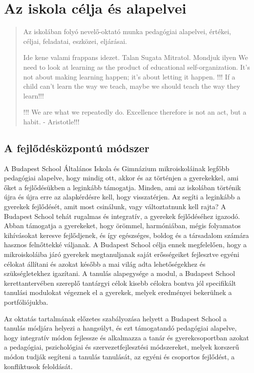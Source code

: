\chapter{Az iskola célja és alapelvei}
\label{sec:alapelvek}

\begin{quote}
  Az iskolában folyó nevelő-oktató munka pedagógiai alapelvei, értékei, céljai, feladatai, eszközei, eljárásai.

  Ide kene valami frappans idezet. Talan Sugata Mitratol. Mondjuk ilyen We need to look at learning as the product of educational self-organization. It’s not about making learning happen; it’s about letting it happen.
  !!! If a child can't learn the way we teach, maybe we should teach the way they learn!!!

!!! We are what we repeatedly do. Excellence therefore is not an act, but a habit. - Aristotle!!!

\end{quote}


\section{A fejlődésközpontú módszer}
A Budapest School Általános Iskola és Gimnázium mikroiskoláinak legfőbb
pedagógiai alapelve, hogy mindig ott, akkor és az történjen a
gyerekekkel, ami őket a fejlődésükben a leginkább támogatja. Minden, ami
az iskolában történik újra és újra erre az alapkérdésre kell, hogy
visszatérjen. Az segíti a leginkább a gyerekek fejlődését, amit most
csinálunk, vagy változtatnunk kell rajta? A Budapest School
tehát rugalmas és integratív, a gyerekek fejlődéséhez igazodó. Abban
támogatja a gyerekeket, hogy örömmel, harmóniában, mégis folyamatos
kihívásokat keresve fejlődjenek, és így egészséges, boldog és a
társadalom számára hasznos felnőttekké váljanak. A Budapest School
célja ennek megfelelően, hogy a mikroiskoláiba járó gyerekek
megtanuljanak saját erősségeiket fejlesztve egyéni célokat állítani és
azokat később a mai világ adta lehetőségekhez és szükségletekhez
igazítani. A tanulás alapegysége a modul, a Budapest School kerettantervében szereplő tantárgyi célok kisebb célokra bontva jól specifikált tanulási modulokat végeznek el a gyerekek, melyek eredményei bekerülnek a portfóliójukba.  

Az oktatás tartalmának előzetes szabályozása helyett a Budapest School a tanulás módjára
helyezi a hangsúlyt, és ezt támogatandó pedagógiai alapelve, hogy
integratív módon fejlessze és alkalmazza a tanár és gyerekcsoportban
azokat a pedagógiai, pszichológiai és szervezetfejlesztési módszereket,
melyek korszerű módon tudják segíteni a tanulás tanulását, az egyéni és
csoportos fejlődést, a konfliktusok feloldását.

